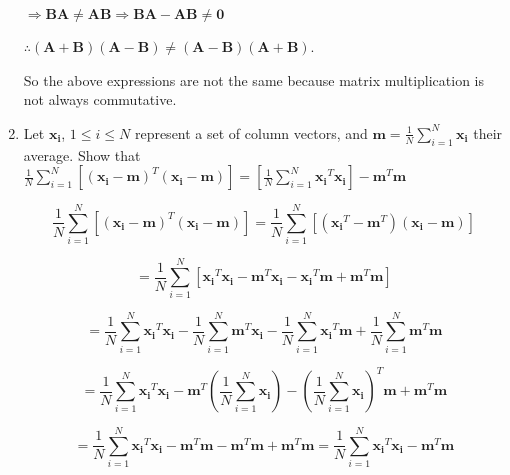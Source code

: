 \documentclass[fleqn]{article}
\begin{document}
\begin{enumerate}
		$\Rightarrow \mathbf{BA} \neq \mathbf{AB} \Rightarrow \mathbf{BA} - \mathbf{AB} \neq \mathbf{0}$
		
		$\therefore (\mathbf{A} + \mathbf{B})(\mathbf{A} - \mathbf{B}) \neq (\mathbf{A} - \mathbf{B})(\mathbf{A} + \mathbf{B})$.
		
		So the above expressions are not the same because matrix multiplication is not always commutative.
		
		\item Let $\mathbf{x_i}$, $1 \leq i \leq N$ represent a set of column vectors, and $\mathbf{m} = \frac{1}{N}\sum_{i=1}^{N}{\mathbf{x_i}}$ their average. Show that $\frac{1}{N}\sum_{i=1}^{N}\left[(\mathbf{x_i}-\mathbf{m})^T(\mathbf{x_i}-\mathbf{m})\right] = \left[\frac{1}{N}\sum_{i=1}^{N}{\mathbf{x_i}^T\mathbf{x_i}}\right]-\mathbf{m}^T\mathbf{m}$
		
		\begin{equation*}
			\frac{1}{N}\sum_{i=1}^{N}\left[(\mathbf{x_i}-\mathbf{m})^T(\mathbf{x_i}-\mathbf{m})\right] = \frac{1}{N}\sum_{i=1}^{N}\left[(\mathbf{x_i}^T-\mathbf{m}^T)(\mathbf{x_i}-\mathbf{m})\right]
		\end{equation*}
			
		\begin{equation*}
			 = \frac{1}{N}\sum_{i=1}^{N}\left[\mathbf{x_i}^T\mathbf{x_i}-\mathbf{m}^T\mathbf{x_i}-\mathbf{x_i}^T\mathbf{m}+\mathbf{m}^T\mathbf{m}\right]
		\end{equation*}
		
		\begin{equation*}
			 = \frac{1}{N}\sum_{i=1}^{N}{\mathbf{x_i}^T\mathbf{x_i}}-\frac{1}{N}\sum_{i=1}^{N}{\mathbf{m}^T\mathbf{x_i}}-\frac{1}{N}\sum_{i=1}^{N}{\mathbf{x_i}^T\mathbf{m}}+\frac{1}{N}\sum_{i=1}^{N}{\mathbf{m}^T\mathbf{m}}
		\end{equation*}
				
		\begin{equation*}
			 = \frac{1}{N}\sum_{i=1}^{N}{\mathbf{x_i}^T\mathbf{x_i}}-\mathbf{m}^T\left(\frac{1}{N}\sum_{i=1}^{N}{\mathbf{x_i}}\right)-\left(\frac{1}{N}\sum_{i=1}^{N}{\mathbf{x_i}}\right)^T\mathbf{m}+\mathbf{m}^T\mathbf{m}
		\end{equation*}
		
		\begin{equation*}
			 = \frac{1}{N}\sum_{i=1}^{N}{\mathbf{x_i}^T\mathbf{x_i}}-\mathbf{m}^T\mathbf{m}-\mathbf{m}^T\mathbf{m}+\mathbf{m}^T\mathbf{m} = \frac{1}{N}\sum_{i=1}^{N}{\mathbf{x_i}^T\mathbf{x_i}}-\mathbf{m}^T\mathbf{m}
		\end{equation*}
		

\end{enumerate}
\end{document}
